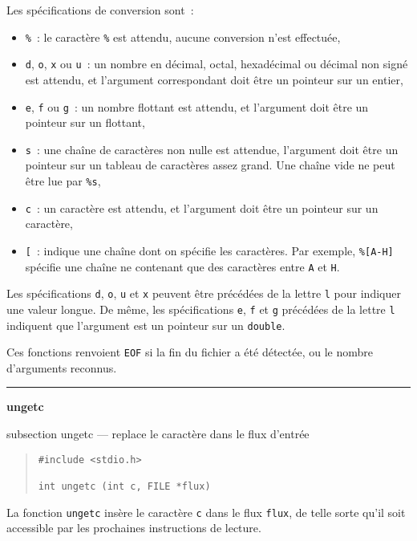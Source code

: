 \documentclass [twoside] {report}
\newcommand {\primitive} [1]
    {
	{\large \bf #1}
	\addcontentsline {toc} {subsection} {#1}
    }
\newcommand {\separation}
    {
	\vspace {7mm}
	\nopagebreak
	\hrule
    }
\begin{document}
Les spécifications de conversion sont~:

\begin {itemize}
    \item {\tt \%}~: le caractère {\tt \%} est attendu, aucune conversion
	n'est effectuée, \par
    \item {\tt d}, {\tt o}, {\tt x} ou {\tt u}~: un nombre en décimal, octal,
	hexadécimal ou décimal non signé est attendu, et l'argument
	correspondant doit être un pointeur sur un entier, \par
    \item {\tt e}, {\tt f} ou {\tt g}~: un nombre flottant est attendu, et
	l'argument doit être un pointeur sur un flottant, \par
    \item {\tt s}~: une chaîne de caractères non nulle est attendue,
	l'argument doit être un pointeur sur un tableau de
	caractères assez grand. Une chaîne vide ne peut être lue par
	{\tt \%s}, \par
    \item {\tt c}~: un caractère est attendu, et l'argument doit être
	un pointeur sur un caractère, \par
    \item {\tt [}~: indique une chaîne dont on spécifie les
	caractères. Par exemple, {\tt \%[A-H]} spécifie une chaîne ne
	contenant que des caractères entre {\tt A} et {\tt H}.
\end {itemize}

Les spécifications {\tt d}, {\tt o}, {\tt u} et {\tt x} peuvent être
précédées de la lettre {\tt l} pour indiquer une valeur longue.
De même, les spécifications {\tt e}, {\tt f} et {\tt g} précédées
de la lettre {\tt l} indiquent que l'argument est un pointeur
sur un {\tt double}.

Ces fonctions renvoient {\tt EOF} si la fin du fichier a été
détectée, ou le nombre d'arguments reconnus.



\separation
\primitive {ungetc} --- replace le caractère dans le flux d'entrée

\begin {quote}
\begin {verbatim}
#include <stdio.h>

int ungetc (int c, FILE *flux)
\end{verbatim}
\end {quote}

La fonction {\tt ungetc} insère le caractère {\tt c} dans le
flux {\tt flux}, de telle sorte qu'il soit accessible par les
prochaines instructions de lecture.
\end{document}
